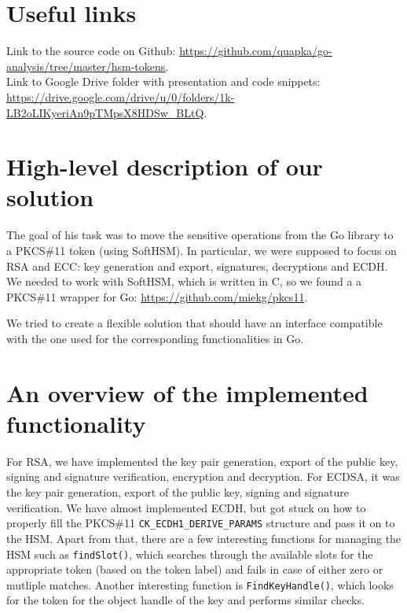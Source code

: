 \documentclass[a4paper]{scrartcl}
\subtitle{}
\begin{document}

\section{Useful links}
Link to the source code on Github: \url{https://github.com/quapka/go-analysis/tree/master/hsm-tokens}.\\
Link to Google Drive folder with presentation and code snippets: \url{https://drive.google.com/drive/u/0/folders/1k-LB2oLIKyeriAn9pTMpsX8HDSw_BLtQ}.

\section{High-level description of our solution }
The goal of his task was to move the sensitive operations from the Go library to a PKCS\#11 token (using SoftHSM). In particular, we were supposed to focus on RSA and ECC: key generation and export, signatures, decryptions and ECDH. We needed to work with SoftHSM, which is written in C, so we found a a PKCS\#11 wrapper for Go: \url{https://github.com/miekg/pkcs11}.

We tried to create a flexible solution that should have an interface compatible with the one used for the corresponding functionalities in Go.


\section{An overview of the implemented functionality}
For RSA, we have implemented the key pair generation, export of the public key, signing and signature verification, encryption and decryption. For ECDSA, it was the key pair generation, export of the public key, signing and signature verification. We have almost implemented ECDH, but got stuck on how to properly fill the PKCS\#11 \verb+CK_ECDH1_DERIVE_PARAMS+ structure and pass it on to the HSM. Apart from that, there are a few interesting functions for managing the HSM such as \lstinline[columns=fixed]{findSlot()}, which searches through the available slots for the appropriate token (based on the token label) and fails in case of either zero or mutliple matches. Another interesting function is \lstinline[columns=fixed]{FindKeyHandle()}, which looks for the token for the object handle of the key and performs similar checks.
\end{document}
